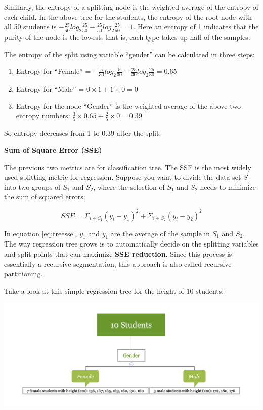 \documentclass[12pt,]{krantz}
\providecommand{\tightlist}{%
  \setlength{\itemsep}{0pt}\setlength{\parskip}{0pt}}
\begin{document}
Similarly, the entropy of a splitting node is the weighted average of the entropy of each child. In the above tree for the students, the entropy of the root node with all 50 students is \(-\frac{25}{50}log_{2}\frac{25}{50}-\frac{25}{50}log_{2}\frac{25}{50}=1\). Here an entropy of 1 indicates that the purity of the node is the lowest, that is, each type takes up half of the samples.

The entropy of the split using variable ``gender'' can be calculated in three steps:

\begin{enumerate}
\def\labelenumi{\arabic{enumi}.}
\tightlist
\item
  Entropy for ``Female'' = \(-\frac{5}{30}log_{2}\frac{5}{30}-\frac{25}{30}log_{2}\frac{25}{30}=0.65\)
\item
  Entropy for ``Male'' = \(0\times1+1\times 0=0\)
\item
  Entropy for the node ``Gender'' is the weighted average of the above two entropy numbers: \(\frac{3}{5}\times 0.65+\frac{2}{5}\times 0=0.39\)
\end{enumerate}

So entropy decreases from 1 to 0.39 after the split.

\textbf{Sum of Square Error (SSE)}

The previous two metrics are for classification tree. The SSE is the most widely used splitting metric for regression. Suppose you want to divide the data set \(S\) into two groups of \(S_{1}\) and \(S_{2}\), where the selection of \(S_{1}\) and \(S_{2}\) needs to minimize the sum of squared errors:

\begin{equation}
SSE=\Sigma_{i\in S_{1}}(y_{i}-\bar{y}_{1})^{2}+\Sigma_{i\in S_{2}}(y_{i}-\bar{y}_{2})^{2}
\label{eq:treesse}
\end{equation}

In equation \eqref{eq:treesse}, \(\bar{y}_{1}\) and \(\bar{y}_{1}\) are the average of the sample in \(S_{1}\) and \(S_{2}\). The way regression tree grows is to automatically decide on the splitting variables and split points that can maximize \textbf{SSE reduction}. Since this process is essentially a recursive segmentation, this approach is also called recursive partitioning.

Take a look at this simple regression tree for the height of 10 students:

\includegraphics{images/varEN.png}
\end{document}
